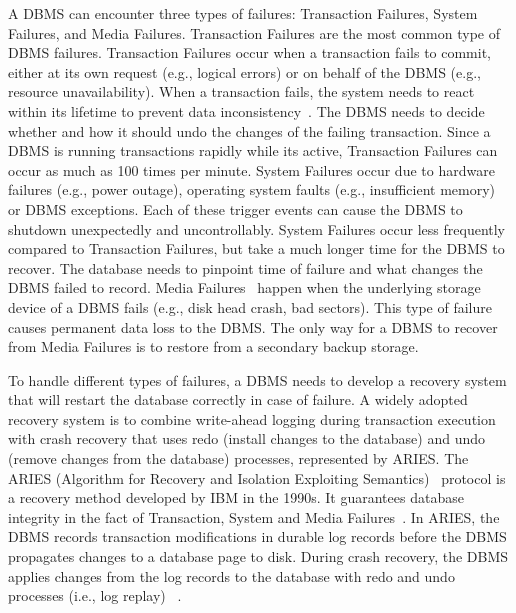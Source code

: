 \documentclass[12pt]{cmuthesis}
\begin{document}
A DBMS can encounter three types of failures: Transaction Failures, System Failures, and Media Failures\cite{theo83}. Transaction Failures are the most common type of DBMS failures. Transaction Failures occur when a transaction fails to commit, either at its own request (e.g., logical errors) or on behalf of the DBMS (e.g., resource unavailability). When a transaction fails, the system needs to react within its lifetime to prevent data inconsistency~\cite{aries}. The DBMS needs to decide whether and how it should undo the changes of the failing transaction. Since a DBMS is running transactions rapidly while its active, Transaction Failures can occur as much as 100 times per minute\cite{theo83}. System Failures occur due to hardware failures (e.g., power outage), operating system faults (e.g., insufficient memory) or DBMS exceptions. Each of these trigger events can cause the DBMS to shutdown unexpectedly and uncontrollably. System Failures occur less frequently compared to Transaction Failures, but take a much longer time for the DBMS to recover. The database needs to pinpoint time of failure and what changes the DBMS failed to record. Media Failures~\cite{sauer17} happen when the underlying storage device of a DBMS fails (e.g., disk head crash, bad sectors). This type of failure causes permanent data loss to the DBMS. The only way for a DBMS to recover from Media Failures is to restore from a secondary backup storage.

To handle different types of failures, a DBMS needs to develop a recovery system that will restart the database correctly in case of failure. A widely adopted recovery system is to combine write-ahead logging during transaction execution with crash recovery that uses redo (install changes to the database) and undo (remove changes from the database) processes, represented by ARIES\cite{malviya14}. The ARIES (Algorithm for Recovery and Isolation Exploiting Semantics)~\cite{aries} protocol is a recovery method developed by IBM in the 1990s. It guarantees database integrity in the fact of Transaction, System and Media Failures~\cite{aries}. In ARIES, the DBMS records transaction modifications in durable log records before the DBMS propagates changes to a database page to disk. During crash recovery, the DBMS applies changes from the log records to the database with redo and undo processes (i.e., log replay) ~\cite{franklin97}.
\end{document}
